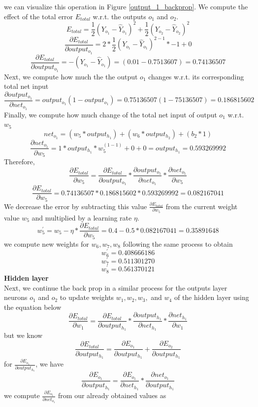 \documentclass[master]{thesis-uestc}
\begin{document}
we can visualize this operation in Figure \ref{output_1_backprop}. We compute the effect of the total error $E_{total}$ w.r.t. the outputs $o_1$ and $o_2$.
\[ E_{total} = \frac{1}{2}(Y_{o_1} - \hat{Y}_{o_1})^2 + \frac{1}{2}(Y_{o_2} - \hat{Y}_{o_2})^2 \]
\[ \frac{\partial E_{total}}{\partial output_{o_1}} = 2 * \frac{1}{2}(Y_{o_1} - \hat{Y}_{o_1})^{2-1} * -1 + 0 \]
\[ \frac{\partial E_{total}}{\partial output_{o_1}} = -(Y_{o_1} - \hat{Y}_{o_1}) = (0.01 - 0.7513607) = 0.74136507 \]
Next, we compute how much the the output $o_1$ changes w.r.t. its corresponding total net input
\[ \frac{\partial output_{o_1}}{\partial net_{o_1}} = output_{o_1}(1 - output_{o_1}) = 0.75136507(1 - 75136507) = 0.186815602 \]
Finally, we compute how much change of the total net input of output $o_1$ w.r.t. $w_5$
\[ net_{o_1} = (w_5 * output_{h_1}) + (w_6 * output_{h_2}) + (b_2 * 1) \]
\[ \frac{\partial net_{o_1}}{\partial w_5} = 1 * output_{h_1} * w^{(1-1)}_{5} + 0 + 0 = output_{h_1} = 0.593269992 \]
Therefore, 
\[ \frac{\partial E_{total}}{\partial w_5} = \frac{\partial E_{total}}{\partial output_{o_1}} * \frac{\partial output_{o_1}}{\partial net_{o_1}} * \frac{\partial net_{o_1}}{\partial w_5}\]
\[ \frac{\partial E_{total}}{\partial w_5} = 0.74136507 * 0.186815602 * 0.593269992 = 0.082167041 \]
We decrease the error by subtracting this value $\frac{\partial E_{total}}{\partial w_5}$ from the current weight value $w_5$ and multiplied by a learning rate $\eta$.
\[ w^{\prime}_{5} = w_5 - \eta * \frac{\partial E_{total}}{\partial w_5} = 0.4 - 0.5 * 0.082167041 = 0.35891648 \]
we compute new weights for $w_6, w_7, w_8$ following the same process to obtain
\[ w^{\prime}_{6} = 0.408666186 \]
\[ w^{\prime}_{7} = 0.511301270 \]
\[ w^{\prime}_{8} = 0.561370121 \]
\textbf{Hidden layer}\\
Next, we continue the back prop in a similar process for the outputs layer neurons $o_1$ and $o_2$ to update weights $w_1, w_2, w_3,$ and $w_4$ of the hidden layer using the equation below
\[ \frac{\partial E_{total}}{\partial w_1} = \frac{\partial E_{total}}{\partial output_{h_1}} * \frac{\partial output_{h_1}}{\partial net_{h_1}} * \frac{\partial net_{h_1}}{\partial w_1} \]
but we know 
\[ \frac{\partial E_{total}}{\partial output_{h_1}} = \frac{\partial E_{o_1}}{\partial output_{h_1}} + \frac{\partial E_{o_2}}{\partial output_{h_1}} \]
for $\frac{\partial E_{o_1}}{\partial output_{h_1}}$, we have 
\[ \frac{\partial E_{o_1}}{\partial output_{h_1}} = \frac{\partial E_{o_1}}{\partial net_{h_1}} * \frac{\partial net_{o_1}}{\partial output_{h_1}} \]
we compute $\frac{\partial E_{o_1}}{\partial net_{o_1}}$ from our already obtained values as
\end{document}

